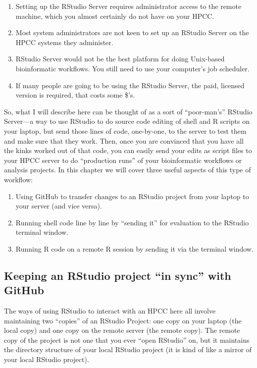 \documentclass[]{krantz}
\providecommand{\tightlist}{%
  \setlength{\itemsep}{0pt}\setlength{\parskip}{0pt}}
\begin{document}
\begin{enumerate}
\def\labelenumi{\arabic{enumi}.}
\tightlist
\item
  Setting up the RStudio Server requires administrator access to the remote
  machine, which you almost certainly do not have on your HPCC.
\item
  Most system administrators are not keen to set up an RStudio Server on the
  HPCC systems they administer.
\item
  RStudio Server would not be the best platform for doing Unix-based
  bioinformatic workflows. You still need to use your computer's job scheduler.
\item
  If many people are going to be using the RStudio Server, the paid, licensed
  version is required, that costs some \$'s.
\end{enumerate}

So, what I will describe here can be thought of as a sort of ``poor-man's''
RStudio Server---a way to use RStudio to do source code editing of shell and R
scripts on your laptop, but send those
lines of code, one-by-one, to the server to test them and make sure that they work. Then,
once you are convinced that you have all the kinks worked out of that code, you
can easily send your edits as script files to your HPCC server to do ``production
runs'' of your bioinformatic workflows or analysis projects. In this chapter we will
cover three useful aspects of this type of workflow:

\begin{enumerate}
\def\labelenumi{\arabic{enumi}.}
\tightlist
\item
  Using GitHub to transfer changes to an RStudio project from your laptop to
  your server (and vice versa).
\item
  Running shell code line by line by ``sending it'' for evaluation to the RStudio
  terminal window.
\item
  Running R code on a remote R session by sending it via the terminal window.
\end{enumerate}

\hypertarget{keeping-an-rstudio-project-in-sync-with-github}{%
\subsection{Keeping an RStudio project ``in sync'' with GitHub}\label{keeping-an-rstudio-project-in-sync-with-github}}

The ways of using RStudio to interact with an HPCC here all involve maintaining
two ``copies'' of an RStudio Project: one copy on your laptop (the local copy) and
one copy on the remote server (the remote copy). The remote copy of the project
is not one that you ever ``open RStudio'' on, but it maintains the directory
structure of your local RStudio project (it is kind of like a mirror of your
local RStudio project).
\end{document}
